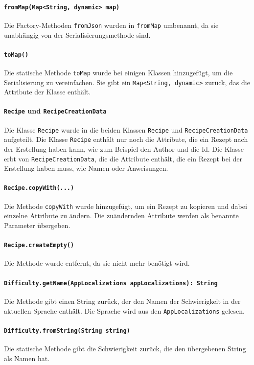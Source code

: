 \documentclass{implementierungsheft}
\begin{document}
\paragraph*{\texttt{fromMap(Map<String, dynamic> map)}} Die Factory-Methoden \texttt{fromJson} wurden in \texttt{fromMap} umbenannt, da sie unabhängig von der Serialisierungsmethode sind.
\paragraph*{\texttt{toMap()}} Die statische Methode \texttt{toMap} wurde bei einigen Klassen hinzugefügt, um die Serialisierung zu vereinfachen. Sie gibt ein \texttt{Map<String, dynamic>} zurück, das die Attribute der Klasse enthält.
\paragraph{\texttt{Recipe} und \texttt{RecipeCreationData}}
Die Klasse \texttt{Recipe} wurde in die beiden Klassen \texttt{Recipe} und \texttt{RecipeCreationData} aufgeteilt. Die Klasse \texttt{Recipe} enthält nur noch die Attribute, die ein Rezept nach der Erstellung haben kann, wie zum Beispiel den Author und die Id. Die Klasse erbt von \texttt{RecipeCreationData}, die die Attribute enthält, die ein Rezept bei der Erstellung haben muss, wie Namen oder Anweisungen.
\paragraph{\texttt{Recipe.copyWith(...)}} Die Methode \texttt{copyWith} wurde hinzugefügt, um ein Rezept zu kopieren und dabei einzelne Attribute zu ändern. Die zuändernden Attribute werden als benannte Parameter übergeben.
\paragraph{\texttt{Recipe.createEmpty()}} Die Methode wurde entfernt, da sie nicht mehr benötigt wird.
\paragraph{\texttt{Difficulty.getName(AppLocalizations appLocalizations): String}}
Die Methode gibt einen String zurück, der den Namen der Schwierigkeit in der aktuellen Sprache enthält. Die Sprache wird aus den \texttt{AppLocalizations} gelesen.
\paragraph{\texttt{Difficulty.fromString(String string)}}
Die statische Methode gibt die Schwierigkeit zurück, die den übergebenen String als Namen hat.
\end{document}
